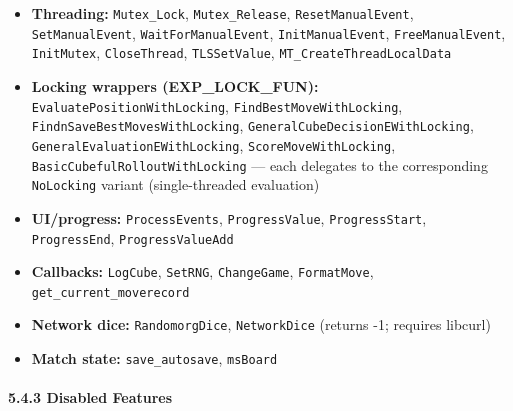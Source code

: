 \documentclass[11pt,a4paper]{article}
\providecommand{\tightlist}{\setlength{\itemsep}{2pt}\setlength{\parskip}{0pt}}
\begin{document}
\begin{itemize}
\tightlist
\item
  \textbf{Threading:} \texttt{Mutex\_Lock}, \texttt{Mutex\_Release},
  \texttt{ResetManualEvent}, \texttt{SetManualEvent},
  \texttt{WaitForManualEvent}, \texttt{InitManualEvent},
  \texttt{FreeManualEvent}, \texttt{InitMutex}, \texttt{CloseThread},
  \texttt{TLSSetValue}, \texttt{MT\_CreateThreadLocalData}
\item
  \textbf{Locking wrappers (EXP\_LOCK\_FUN):}
  \texttt{EvaluatePositionWithLocking},
  \texttt{FindBestMoveWithLocking},
  \texttt{FindnSaveBestMovesWithLocking},
  \texttt{GeneralCubeDecisionEWithLocking},
  \texttt{GeneralEvaluationEWithLocking}, \texttt{ScoreMoveWithLocking},
  \texttt{BasicCubefulRolloutWithLocking} --- each delegates to the
  corresponding \texttt{NoLocking} variant (single-threaded evaluation)
\item
  \textbf{UI/progress:} \texttt{ProcessEvents}, \texttt{ProgressValue},
  \texttt{ProgressStart}, \texttt{ProgressEnd},
  \texttt{ProgressValueAdd}
\item
  \textbf{Callbacks:} \texttt{LogCube}, \texttt{SetRNG},
  \texttt{ChangeGame}, \texttt{FormatMove},
  \texttt{get\_current\_moverecord}
\item
  \textbf{Network dice:} \texttt{RandomorgDice}, \texttt{NetworkDice}
  (returns -1; requires libcurl)
\item
  \textbf{Match state:} \texttt{save\_autosave}, \texttt{msBoard}
\end{itemize}

\paragraph{5.4.3 Disabled Features}\label{disabled-features}
\end{document}
